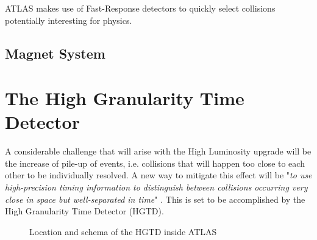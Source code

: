 ATLAS makes use of Fast-Response detectors to quickly select collisions potentially interesting for physics.



\subsection{Magnet System}\label{subsec:magnet_system}


\section{The High Granularity Time Detector}\label{sec:HGTD}
A considerable challenge that will arise with the High Luminosity upgrade will be the increase of pile-up of events, i.e. collisions that will happen too close to each other to be individually resolved. 
A new way to mitigate this effect will be "\textit{to use high-precision timing information to distinguish between collisions occurring very close in space but well-separated in time}" \cite{CERN-LHCC-2020-007}. This is set to be accomplished by the High Granularity Time Detector (HGTD).

\begin{figure}[!ht]
    \centering
    \hfill
    \centering
    \caption{Location and schema of the HGTD inside ATLAS}
\end{figure}

